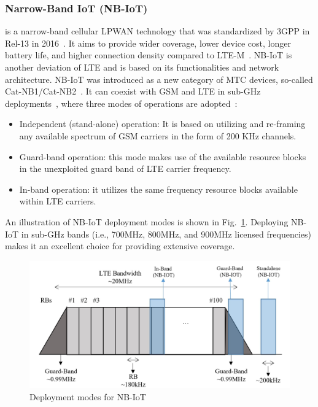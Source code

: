 \documentclass[]{IEEEtran}
\begin{document}
\subsubsection{Narrow-Band IoT (NB-IoT)}
\label{sec:2-2-1}
is a narrow-band cellular LPWAN technology that was standardized by 3GPP in Rel-13 in 2016~\cite{TR_45.820}.
It aims to provide wider coverage, lower device cost, longer battery life, and higher connection density compared to LTE-M~\cite{ding_iot_2020}.
NB-IoT is another deviation of LTE and is based on its functionalities and network architecture.
NB-IoT was introduced as a new category of MTC devices, so-called Cat-NB1/Cat-NB2~\cite{liberg_cellular_2019}.
It can coexist with GSM and LTE in sub-GHz deployments~\cite{chaudhari2020lpwan}, where three modes of operations are adopted~\cite{chen2017narrow,chettri_comprehensive_2020_1}:
 \begin{itemize}
     \item Independent (stand-alone) operation: It is based on utilizing and re-framing any available spectrum of GSM carriers in the form of 200 KHz channels.
     \item Guard-band operation: this mode makes use of the available resource blocks in the unexploited guard band of LTE carrier frequency.
     \item In-band operation: it utilizes the same frequency resource blocks available within LTE carriers. 
 \end{itemize}
An illustration of NB-IoT deployment modes is shown in Fig.~\ref{fig:NB-IoT-deployments}.
Deploying NB-IoT in sub-GHz bands (i.e., 700MHz, 800MHz, and 900MHz licensed frequencies) makes it an excellent choice for providing extensive coverage. 
\begin{figure}
    \centering
        \includegraphics[width=\linewidth]{Pictures/Deployments supported by NB-IoT.png}
    \caption{Deployment modes for NB-IoT}
    \label{fig:NB-IoT-deployments}
\end{figure}
\end{document}
